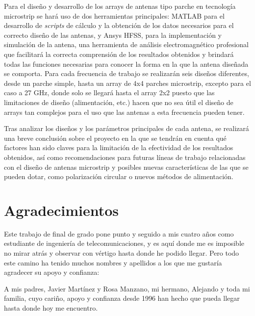 \par Para el diseño y desarrollo de los arrays de antenas tipo parche en tecnología microstrip se hará uso de dos herramientas principales: MATLAB para el desarrollo de \textit{scripts} de cálculo y la obtención de los datos necesarios para el correcto diseño de las antenas, y Ansys HFSS, para la implementación y simulación de la antena, una herramienta de análisis electromagnético profesional que facilitará la correcta comprensión de los resultados obtenidos y brindará todas las funciones necesarias para conocer la forma en la que la antena diseñada se comporta. Para cada frecuencia de trabajo se realizarán seis diseños diferentes, desde un parche simple, hasta un array de 4x4 parches microstrip, excepto para el caso a 27 GHz, donde solo se llegará hasta el array 2x2 puesto que las limitaciones de diseño (alimentación, etc.) hacen que no sea útil el diseño de arrays tan complejos para el uso que las antenas a esta frecuencia pueden tener.
\\
\par Tras analizar los diseños y los parámetros principales de cada antena, se realizará una breve conclusión sobre el proyecto en la que se tendrán en cuenta qué factores han sido claves para la limitación de la efectividad de los resultados obtenidos, así como recomendaciones para futuras líneas de trabajo relacionadas con el diseño de antenas microstrip y posibles nuevas características de las que se pueden dotar, como polarización circular o nuevos métodos de alimentación.





\cleardoublepage %
\chapter*{Agradecimientos}

\thispagestyle{empty}
\vspace{1cm}

\par Este trabajo de final de grado pone punto y seguido a mis cuatro años como estudiante de ingeniería de telecomunicaciones, y es aquí donde me es imposible no mirar atrás y observar con vértigo hasta donde he podido llegar.
Pero todo este camino ha tenido muchos nombres y apellidos a los que me gustaría agradecer su apoyo y confianza:

\par A mis padres, Javier Martínez y Rosa Manzano, mi hermano, Alejando y toda mi familia, cuyo cariño, apoyo y confianza desde 1996 han hecho que pueda llegar hasta donde hoy me encuentro.



